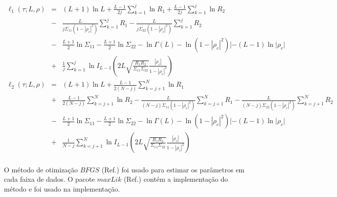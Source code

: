 \documentclass[remotesensing,article,submit,moreauthors,pdftex]{Definitions/mdpi}
\begin{document}
 \begin{equation}
\begin{array}{ccc}\label{func_l_param_L_rho_razao}
    \ell_1(\tau; L, \rho)&=&(L+1)\ln L +\frac{L-1}{2j}\sum_{k=1}^{j}\ln R_1 +\frac{L-1}{2j} \sum_{k=1}^{j}\ln R_2 \\
    &-&\frac{L}{j\Sigma_{11}(1-|\rho_c|^2)}\sum_{k=1}^{j}R_1-\frac{L}{j\Sigma_{22}(1-|\rho_c|^2)}\sum_{k=1}^{j}R_2\\
	&-&\frac{L+1}{2}\ln\Sigma_{11}-\frac{L+1}{2}\ln\Sigma_{22} - \ln\Gamma(L)- \ln(1-|\rho_c|^2)|-(L-1)\ln|\rho_c|\\
	&+&\frac{1}{j}\sum_{k=1}^{j}\ln I_{L-1}\left(2L\sqrt{\frac{R_1R_2}{\Sigma_{11}\Sigma_{22}}}\frac{|\rho_c|}{1-|\rho_c|^2}\right)\\
    \ell_2(\tau; L, \rho)&=&(L+1)\ln L +\frac{L-1}{2(N-j)}\sum_{k=j+1}^{N}\ln R_1 \\
              &+&\frac{L-1}{2(N-j)} \sum_{k=j+1}^{N}\ln R_2 -\frac{L}{(N-j)\Sigma_{11}(1-|\rho_c|^2)}\sum_{k=j+1}^{N}R_1-\frac{L}{(N-j)\Sigma_{22}(1-|\rho_c|^2)}\sum_{k=j+1}^{N}R_2\\
	&-&\frac{L+1}{2}\ln\Sigma_{11}-\frac{L+1}{2}\ln\Sigma_{22} - \ln\Gamma(L)- \ln(1-|\rho_c|^2)|-(L-1)\ln|\rho_c|\\
	&+&\frac{1}{N-j}\sum_{k=j+1}^{N}\ln I_{L-1}\left(2L\sqrt{\frac{R_1R_2}{\Sigma_{11}\Sigma_{22}}}\frac{|\rho_c|}{1-|\rho_c|^2}\right)\\
 \end{array}
 \end{equation}

O método de otimização $BFGS$ (Ref.\cite{nw_2006}) foi usado para estimar os parâmetros em cada faixa de dados. O pacote $maxLik$ (Ref.\cite{ht_2011}) contém a implementação do método e foi usado na implementação.
 
\end{document}
